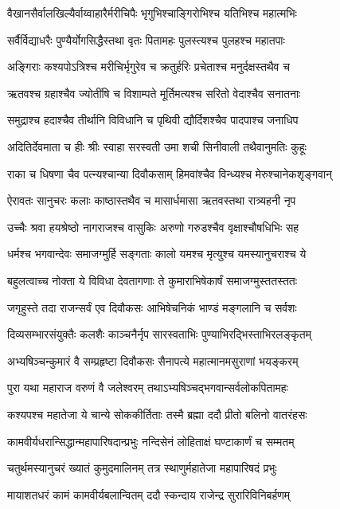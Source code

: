 \twolineshloka
{वैखानसैर्वालखिल्यैर्वाय्वाहारैर्मरीचिपैः}
{भृगुभिश्चाङ्गिरोभिश्च यतिभिश्च महात्मभिः}


\twolineshloka
{सर्वैर्विद्याधरैः पुण्यैर्योगसिद्धैस्तथा वृतः}
{पितामहः पुलस्त्यश्च पुलहश्च महातपाः}


\twolineshloka
{अङ्गिराः कश्यपोऽत्रिश्च मरीचिर्भृगुरेव च}
{क्रतुर्हरिः प्रचेताश्च मनुर्दक्षस्तथैव च}


\twolineshloka
{ऋतवश्च ग्रहाश्चैव ज्योतींषि च विशाम्पते}
{मूर्तिमत्यश्च सरितो वेदाश्चैव सनातनाः}


\twolineshloka
{समुद्राश्च हदाश्चैव तीर्थानि विविधानि च}
{पृथिवी द्यौर्दिशश्चैव पादपाश्च जनाधिप}


\twolineshloka
{अदितिर्देवमाता च हीः श्रीः स्वाहा सरस्वती}
{उमा शची सिनीवाली तथैवानुमतिः कुहूः}


\twolineshloka
{राका च धिषणा चैव पत्न्यश्चान्या दिवौकसाम्}
{हिमवांश्चैव विन्ध्यश्च मेरुश्चानेकशृङ्गवान्}


\twolineshloka
{ऐरावतः सानुचरः कलाः काष्ठास्तथैव च}
{मासार्धमासा ऋतवस्तथा रात्र्यहनी नृप}


\twolineshloka
{उच्चैः श्रवा हयश्रेष्ठो नागराजश्च वासुकिः}
{अरुणो गरुडश्चैव वृक्षाश्चौषधिभिः सह}


\twolineshloka
{धर्मश्च भगवान्देवः समाजग्मुर्हि सङ्गताः}
{कालो यमश्च मृत्युश्च यमस्यानुचराश्च ये}


\twolineshloka
{बहुलत्वाच्च नोक्ता ये विविधा देवतागणाः}
{ते कुमाराभिषेकार्षं समाजग्मुस्ततस्ततः}


\twolineshloka
{जगृहुस्ते तदा राजन्सर्वं एव दिवौकसः}
{आभिषेचनिकं भाण्डं मङ्गलानि च सर्वशः}


\twolineshloka
{दिव्यसम्भारसंयुक्तैः कलशैः काञ्चनैर्नृप}
{सारस्वताभिः पुण्याभिरद्भिस्ताभिरलङ्कृतम्}


\twolineshloka
{अभ्यषिञ्चन्कुमारं वै सम्प्रहृष्टा दिवौकसः}
{सैनापत्ये महात्मानमसुराणां भयङ्करम्}


\twolineshloka
{पुरा यथा महाराज वरुणं वै जलेश्वरम्}
{तथाऽभ्यषिञ्चद्भगवान्सर्वलोकपितामहः}


\twolineshloka
{कश्यपश्च महातेजा ये चान्ये सोककीर्तिताः}
{तस्मै ब्रह्मा ददौ प्रीतो बलिनो वातरंहसः}


\twolineshloka
{कामवीर्यधरान्सिद्धान्महापारिषदान्प्रभुः}
{नन्दिसेनं लोहिताक्षं घण्टाकार्णं च सम्मतम्}


\twolineshloka
{चतुर्थमस्यानुचरं ख्यातं कुमुदमालिनम्}
{तत्र स्थाणुर्महातेजा महापारिषदं प्रभुः}


\twolineshloka
{मायाशतधरं कामं कामवीर्यबलान्वितम्}
{ददौ स्कन्दाय राजेन्द्र सुरारिविनिबर्हणम्}



